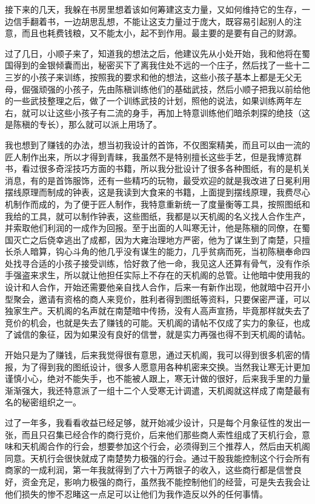 接下来的几天，我躲在书房里想着该如何筹建这支力量，又如何维持它的生存，一边信手翻着书，一边胡思乱想，不能让这支力量过于庞大，既容易引起别人的注意，而且也耗费钱粮，又不能太小，起不到作用。最主要的是要有自己的财源。

过了几日，小顺子来了，知道我的想法之后，他建议先从小处开始，我和他将在蜀国得到的金银倾囊而出，秘密买下了离我住处不远的一个庄子，然后找了一些十二三岁的小孩子来训练，按照我的要求和他的想法，这些小孩子基本上都是无父无母，倔强顽强的小孩子，先由陈稹训练他们的基础武技，然后小顺子把我以前给他的一些武技整理之后，做了一个训练武技的计划，照他的说法，如果训练两年左右，就可以让这些小孩子有二流的身手，再加上特意训练他们暗杀刺探的绝技（这是陈稹的专长），那么就可以派上用场了。

我也想到了赚钱的办法，想当初我设计的首饰，不仅图案精美，而且可以由一流的匠人制作出来，所以才得到青睐，我虽然不是特别擅长这些手艺，但是我博览群书，看过很多奇淫技巧方面的书籍，所以我分批设计了很多各种图纸，有的是机关消息，有的是首饰服饰，还有一些精巧的玩物，最受欢迎的就是我改进了日冕利用摆线原理而制成的钟表，这是我读到大食来的书籍，上面提到摆线原理，我费尽心机制作而成的，为了便于匠人制作，我特意重新统一了度量衡等工具，按照图纸和我给的工具，就可以制作钟表，这些图纸，我都是以天机阁的名义找人合作生产，并索取他们利润的一成作为回报。至于出面的人叫寒无计，他是陈稹的同僚，在蜀国灭亡之后侥幸逃出了成都，因为大雍治理地方严密，他为了谋生到了南楚，只擅长杀人暗算，钩心斗角的他几乎没有谋生的能力，几乎贫病而死，当初陈稹奉命四处找寻合适的小孩子接受训练，恰好救了他一命，我见这人还算有骨气，没有作杀手强盗来求生，所以就让他担任实际上不存在的天机阁的总管。让他暗中使用我的设计和人合作，开始还需要他亲自找人合作，后来一有新作出现，他就暗中召开小型聚会，邀请有资格的商人来竞价，胜利者得到图纸等资料，只要保密严谨，可以独家生产。天机阁的名声就在南楚暗中传扬，没有人高声宣扬，毕竟那样就失去了竞价的机会，也就是失去了赚钱的可能。天机阁的请帖不仅成了实力的象征，也成了诚信的象征，因为如果没有良好的信誉，就是实力再强也得不到天机阁的请帖。

开始只是为了赚钱，后来我觉得很有意思，通过天机阁，我可以得到很多机密的情报，为了得到我的图纸设计，很多人愿意用各种机密来交换。当然我让寒无计更加谨慎小心，绝对不能失手，也不能被人跟上，寒无计做的很好，后来我手里的力量渐渐强大，我还特意派了一组十二个人受寒无计调遣，天机阁就这样成了南楚最有名的秘密组织之一。

过了一年多，我看看收益已经足够，就开始减少设计，只是每个月象征性的发出一张，而且只召集已经合作的商行竞价，后来他们那些商人索性组成了天机行会，意味和天机阁合作的行会，想要参加这个行会，必须得到三个推荐人，然后由天机阁同意。天机行会很快就成了南楚势力极强的行会。通过干股我能控制这个行会所有商家的一成利润，第一年我就得到了六十万两银子的收入，这些商行都是信誉良好，资金充足，影响力极强的商行，虽然我不能控制他们的经营，可是失去我会让他们损失的惨不忍睹这一点足可以让他们为我作造反以外的任何事情。

